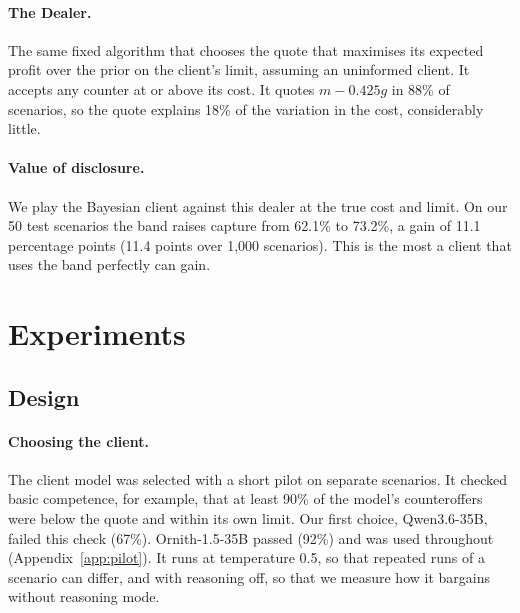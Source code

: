 \documentclass[sigconf]{acmart}
\begin{document}
\paragraph{The Dealer.}
The same fixed algorithm that chooses the quote that maximises its expected profit over the prior on the client's limit, assuming an uninformed client. It accepts any counter at or above its cost. It quotes $m - 0.425g$ in 88\% of scenarios, so the quote explains 18\% of the variation in the cost, considerably little.

\paragraph{Value of disclosure.}
We play the Bayesian client against this dealer at the true cost and limit. On our 50 test scenarios the band raises capture from 62.1\% to 73.2\%, a gain of 11.1 percentage points (11.4 points over 1,000 scenarios). This is the most a client that uses the band perfectly can gain.


\section{Experiments}

\subsection{Design}

\paragraph{Choosing the client.}
The client model was selected with a short pilot on separate scenarios. It checked basic competence, for example, that at least 90\% of the model's counteroffers were below the quote and within its own limit. Our first choice, Qwen3.6-35B, failed this check (67\%). Ornith-1.5-35B passed (92\%) and was used throughout (Appendix~\ref{app:pilot}). It runs at temperature 0.5, so that repeated runs of a scenario can differ, and with reasoning off, so that we measure how it bargains without reasoning mode.
\end{document}
